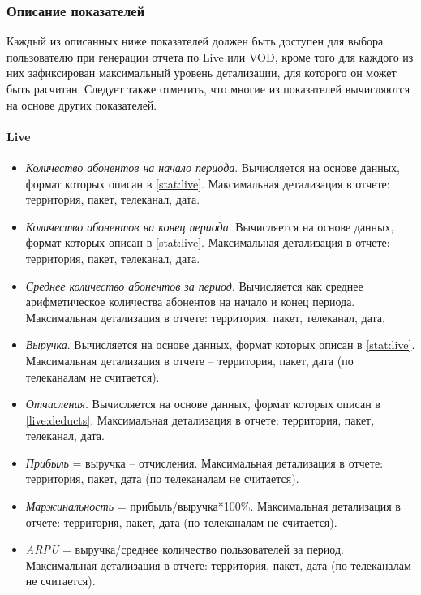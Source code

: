 \subsubsection{Описание показателей}
\label{reports:indicators}
Каждый из описанных ниже показателей должен быть доступен для выбора пользователю при генерации
отчета по Live или VOD, кроме того для каждого из них зафиксирован максимальный уровень детализации,
для которого он может быть расчитан. Следует также отметить, что многие из показателей вычисляются
на основе других показателей.

\paragraph{Live}
\begin{itemize}
\item{
\textit{Количество абонентов на начало периода}. Вычисляется на основе данных, формат которых описан в \ref{stat:live}.
 Максимальная детализация в отчете: территория, пакет, телеканал, дата.
}
\item{
\textit{Количество абонентов на конец периода}. Вычисляется на основе данных, формат которых описан в \ref{stat:live}.
Максимальная детализация в отчете: территория, пакет, телеканал, дата.
}
\item{
\textit{Среднее количество абонентов за период}.  Вычисляется как среднее арифметическое количества абонентов на начало 
и конец периода. Максимальная детализация в отчете: территория, пакет, телеканал, дата.
}
\item{
\textit{Выручка}. Вычисляется на основе данных, формат которых описан в \ref{stat:live}.
Максимальная детализация в отчете – территория, пакет, дата (по телеканалам не считается).
}
\item{
\textit{Отчисления}. Вычисляется на основе данных, формат которых описан в \ref{live:deducts}.
Максимальная детализация в отчете: территория, пакет, телеканал, дата.
}
\item{
\textit{Прибыль} = выручка – отчисления. Максимальная детализация в отчете: территория, пакет, дата (по телеканалам не считается). 
}
\item{
\textit{Маржинальность} = прибыль/выручка*100\%. Максимальная детализация в отчете: территория, пакет, дата (по телеканалам не считается).
}
\item{
\textit{ARPU} = выручка/среднее количество пользователей за период. Максимальная детализация в отчете: территория, пакет, дата (по телеканалам не считается).
}
\end{itemize}

